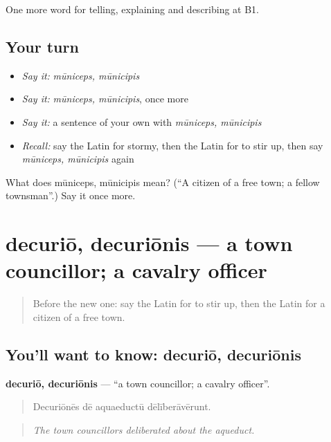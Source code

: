 \begin{grammarlens}[title={What you've built}]
One more word for telling, explaining and describing at B1.
\end{grammarlens}

\subsection*{Your turn}
\begin{itemize}
\raggedright
  \item \emph{Say it:} \emph{mūniceps, mūnicipis}
  \item \emph{Say it:} \emph{mūniceps, mūnicipis}, once more
  \item \emph{Say it:} a sentence of your own with \emph{mūniceps, mūnicipis}
  \item \emph{Recall:} say the Latin for stormy, then the Latin for to stir up, then say \emph{mūniceps, mūnicipis} again
\end{itemize}

\begin{tcolorbox}[breakable,colback=teal!4,colframe=teal!35!black,title={Before you move on}]
What does mūniceps, mūnicipis mean? (\textquotedblleft{}A citizen of a free town; a fellow townsman\textquotedblright{}.) Say it once more.
\end{tcolorbox}
\section[decuriō, decuriōnis]{decuriō, decuriōnis — a town councillor; a cavalry officer}

\label{lesson:LA-C388-decurio}



\begin{quote}
Before the new one: say the Latin for to stir up, then the Latin for a citizen of a free town.
\end{quote}

\subsection*{You'll want to know: decuriō, decuriōnis}
\textbf{decuriō, decuriōnis} — \textquotedblleft{}a town councillor; a cavalry officer\textquotedblright{}.

\begin{quote}
Decuriōnēs dē aquaeductū dēlīberāvērunt.
\end{quote}

\begin{quote}
\emph{The town councillors deliberated about the aqueduct.}
\end{quote}

